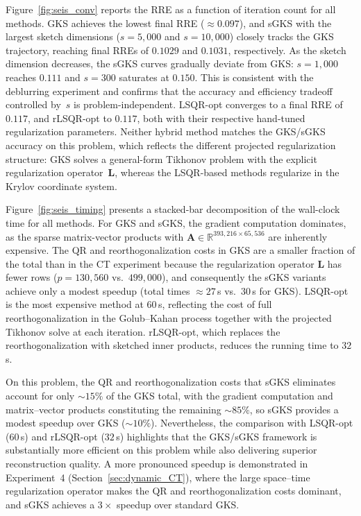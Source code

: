 \documentclass[%
  a4paper,
  onecolumn,
  colorlinks,
]{preprint}
\theoremstyle{plain}
\theoremstyle{definition}
\newcommand{\R}{\ensuremath{\mathbb{R}}}
\newcommand{\bA}{\ensuremath{\boldsymbol{A}}}
\newcommand{\bL}{\ensuremath{\boldsymbol{L}}}
\begin{document}
Figure~\ref{fig:seis_conv} reports the RRE as a function of iteration
count for all methods.
GKS achieves the lowest final RRE ($\approx 0.097$), and sGKS with
the largest sketch dimensions ($s = 5{,}000$ and $s = 10{,}000$)
closely tracks the GKS trajectory, reaching final RREs of $0.1029$
and $0.1031$, respectively.
As the sketch dimension decreases, the sGKS curves gradually deviate
from GKS: $s = 1{,}000$ reaches $0.111$ and
$s = 300$ saturates at $0.150$.
This is consistent with the deblurring experiment and confirms that
the accuracy and efficiency tradeoff controlled by~$s$ is
problem-independent.
LSQR-opt converges to a final RRE of $0.117$, and rLSQR-opt to
$0.117$, both with their respective hand-tuned regularization
parameters.
Neither hybrid method matches the GKS/sGKS accuracy on this problem,
which reflects the different projected regularization structure:
GKS solves a general-form Tikhonov problem with the explicit
regularization operator~$\bL$, whereas the LSQR-based methods
regularize in the Krylov coordinate system.

Figure~\ref{fig:seis_timing} presents a stacked-bar decomposition of
the wall-clock time for all methods.
For GKS and sGKS, the gradient computation dominates, as the sparse
matrix-vector products with
$\bA \in \R^{393{,}216 \times 65{,}536}$ are inherently expensive.
The QR and reorthogonalization costs in GKS are a smaller fraction
of the total than in the CT experiment because the regularization
operator $\bL$ has fewer rows ($p = 130{,}560$ vs.\ $499{,}000$),
and consequently the sGKS variants achieve only a modest speedup
(total times $\approx 27$\,s vs.\ $30$\,s for GKS).
LSQR-opt is the most expensive method at $60$\,s, reflecting the
cost of full reorthogonalization in the Golub--Kahan process together
with the projected Tikhonov solve at each iteration.
rLSQR-opt, which replaces the reorthogonalization with sketched
inner products, reduces the running time to $32$\,s.

On this problem, the QR and reorthogonalization costs that sGKS eliminates
account for only ${\sim}15\%$ of the GKS total, with the gradient computation
and matrix--vector products constituting the remaining ${\sim}85\%$, so sGKS
provides a modest speedup over GKS (${\sim}10\%$). Nevertheless, the
comparison
with LSQR-opt ($60$\,s) and rLSQR-opt ($32$\,s) highlights that the
GKS/sGKS framework is substantially more efficient on this problem while also
delivering superior reconstruction quality. A more pronounced speedup is
demonstrated in Experiment~4 (Section~\ref{sec:dynamic_CT}), where the large
space--time regularization operator makes the QR and reorthogonalization costs
dominant, and sGKS achieves a $3\times$ speedup over standard GKS.
\end{document}
